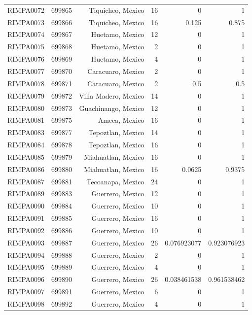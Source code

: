 \documentclass[12pt]{article}
\begin{document}
\begin{table}[htbp]
\begin{tabular}{rrrrrr}
    RIMPA0072 & 699865 & Tiquicheo, Mexico & 16    & 0     & 1 \\
    RIMPA0073 & 699866 & Tiquicheo, Mexico & 16    & 0.125 & 0.875 \\
    RIMPA0074 & 699867 & Huetamo, Mexico & 12    & 0     & 1 \\
    RIMPA0075 & 699868 & Huetamo, Mexico & 2     & 0     & 1 \\
    RIMPA0076 & 699869 & Huetamo, Mexico & 4     & 0     & 1 \\
    RIMPA0077 & 699870 & Caracuaro, Mexico & 2     & 0     & 1 \\
    RIMPA0078 & 699871 & Caracuaro, Mexico & 2     & 0.5   & 0.5 \\
    RIMPA0079 & 699872 & Villa Madero, Mexico & 14    & 0     & 1 \\
    RIMPA0080 & 699873 & Guachinango, Mexico & 12    & 0     & 1 \\
    RIMPA0081 & 699875 & Ameca, Mexico & 16    & 0     & 1 \\
    RIMPA0083 & 699877 & Tepoztlan, Mexico & 14    & 0     & 1 \\
    RIMPA0084 & 699878 & Tepoztlan, Mexico & 16    & 0     & 1 \\
    RIMPA0085 & 699879 & Miahuatlan, Mexico & 16    & 0     & 1 \\
    RIMPA0086 & 699880 & Miahuatlan, Mexico & 16    & 0.0625 & 0.9375 \\
    RIMPA0087 & 699881 & Tecoanapa, Mexico & 24    & 0     & 1 \\
    RIMPA0089 & 699883 & Guerrero, Mexico & 12    & 0     & 1 \\
    RIMPA0090 & 699884 & Guerrero, Mexico & 10    & 0     & 1 \\
    RIMPA0091 & 699885 & Guerrero, Mexico & 16    & 0     & 1 \\
    RIMPA0092 & 699886 & Guerrero, Mexico & 10    & 0     & 1 \\
    RIMPA0093 & 699887 & Guerrero, Mexico & 26    & 0.076923077 & 0.923076923 \\
    RIMPA0094 & 699888 & Guerrero, Mexico & 2     & 0     & 1 \\
    RIMPA0095 & 699889 & Guerrero, Mexico & 4     & 0     & 1 \\
    RIMPA0096 & 699890 & Guerrero, Mexico & 26    & 0.038461538 & 0.961538462 \\
    RIMPA0097 & 699891 & Guerrero, Mexico & 6     & 0     & 1 \\
    RIMPA0098 & 699892 & Guerrero, Mexico & 4     & 0     & 1 \\

\end{tabular}
\end{table}
\end{document}
